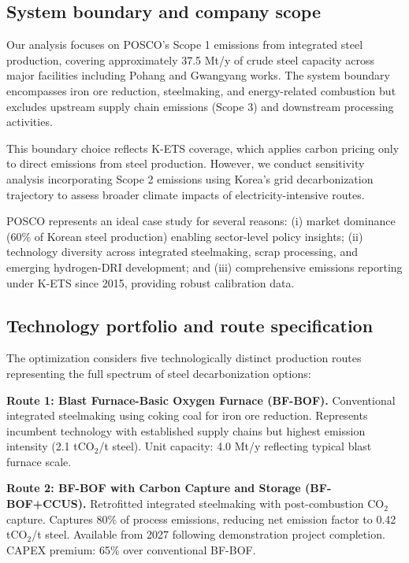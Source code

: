 \documentclass[preprint,5p,authoryear]{elsarticle}
\begin{document}
\subsection{System boundary and company scope}

Our analysis focuses on POSCO's Scope 1 emissions from integrated steel production, covering approximately 37.5 Mt/y of crude steel capacity across major facilities including Pohang and Gwangyang works. The system boundary encompasses iron ore reduction, steelmaking, and energy-related combustion but excludes upstream supply chain emissions (Scope 3) and downstream processing activities.

This boundary choice reflects K-ETS coverage, which applies carbon pricing only to direct emissions from steel production. However, we conduct sensitivity analysis incorporating Scope 2 emissions using Korea's grid decarbonization trajectory to assess broader climate impacts of electricity-intensive routes.

POSCO represents an ideal case study for several reasons: (i) market dominance (60\% of Korean steel production) enabling sector-level policy insights; (ii) technology diversity across integrated steelmaking, scrap processing, and emerging hydrogen-DRI development; and (iii) comprehensive emissions reporting under K-ETS since 2015, providing robust calibration data.

\subsection{Technology portfolio and route specification}

The optimization considers five technologically distinct production routes representing the full spectrum of steel decarbonization options:

\textbf{Route 1: Blast Furnace-Basic Oxygen Furnace (BF-BOF).} Conventional integrated steelmaking using coking coal for iron ore reduction. Represents incumbent technology with established supply chains but highest emission intensity (2.1 tCO$_2$/t steel). Unit capacity: 4.0 Mt/y reflecting typical blast furnace scale.

\textbf{Route 2: BF-BOF with Carbon Capture and Storage (BF-BOF+CCUS).} Retrofitted integrated steelmaking with post-combustion CO$_2$ capture. Captures 80\% of process emissions, reducing net emission factor to 0.42 tCO$_2$/t steel. Available from 2027 following demonstration project completion. CAPEX premium: 65\% over conventional BF-BOF.
\end{document}
